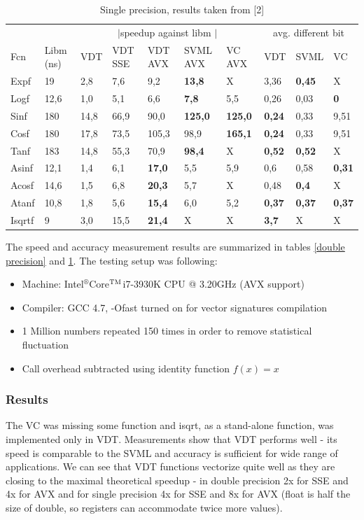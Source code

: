 \documentclass[oneside,10pt,a4paper]{article}
\newcommand{\beI}{\begin{itemize}}
\newcommand{\enI}{\end{itemize}}
\begin{document}
\begin{table}[h]
    \begin{center}
    \begin{tabular}{llllllllll}
      \toprule
      & & \multicolumn{5}{c}{$\!\!\!\!|$\hfill speedup against libm \hfill $|\!\!\!\!$} & \multicolumn{3}{c}{avg. different bit}\\
      Fcn & Libm (ns) & VDT & VDT SSE & VDT AVX & SVML AVX & VC AVX & VDT & SVML & VC\\
      \midrule
Expf&19&2,8&7,6&9,2&\textbf{13,8}&X&3,36&\textbf{0,45}&X\\
Logf&12,6&1,0&5,1&6,6&\textbf{7,8}&5,5&0,26&0,03&\textbf{0}\\
Sinf&180&14,8&66,9&90,0&\textbf{125,0}&\textbf{125,0}&\textbf{0,24}&0,33&9,51\\
Cosf&180&17,8&73,5&105,3&98,9&\textbf{165,1}&\textbf{0,24}&0,33&9,51\\
Tanf&183&14,8&55,3&70,9&\textbf{98,4}&X&\textbf{0,52}&\textbf{0,52}&X\\
Asinf&12,1&1,4&6,1&\textbf{17,0}&5,5&5,9&0,6&0,58&\textbf{0,31}\\
Acosf&14,6&1,5&6,8&\textbf{20,3}&5,7&X&0,48&\textbf{0,4}&X\\
Atanf&10,8&1,8&5,6&\textbf{15,4}&6,0&5,2&\textbf{0,37}&\textbf{0,37}&\textbf{0,37}\\
Isqrtf&9&3,0&15,5&\textbf{21,4}&X&X&\textbf{3,7}&X&X\\
    \bottomrule
   \end{tabular}
    \caption{Single precision, results taken from [2]}
    \label{single precision}
    \end{center}
\end{table}

The speed and accuracy measurement results are summarized in tables \ref{double precision} and \ref{single precision}. The testing setup was following:
\beI
    \item Machine: Intel$^\circledR$Core$^\text{\textsc{TM}}$i7-3930K CPU @ 3.20GHz (AVX support)
    \item Compiler: GCC 4.7, -Ofast turned on for vector signatures compilation
    \item 1 Million numbers repeated 150 times in order to remove statistical fluctuation
    \item Call overhead subtracted using identity function $f(x)=x$
\enI

\subsubsection{Results}
The VC was missing some function and isqrt, as a stand-alone function, was implemented only in VDT. Measurements show that VDT performs well - its speed is comparable to the SVML and accuracy is sufficient for wide range of applications. We can see that VDT functions vectorize quite well as they are closing to the maximal theoretical speedup - in double precision 2x for SSE and 4x for AVX and for single precision 4x for SSE and 8x for AVX (float is half the size of double, so registers can accommodate twice more values).
\end{document}
